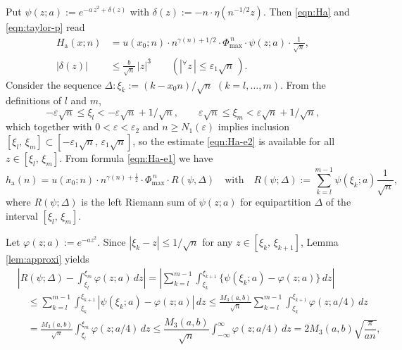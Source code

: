 \documentclass[a4paper,12pt]{article}
\theoremstyle{plain}
\def\ra{\mathrm{a}}
\def\ve{\varepsilon}
\def\vD{\varDelta}
\def\Phim{\Phi_{\scriptstyle \mathrm{max}}}
\def\ds{\displaystyle}
\begin{document}
Put $\psi(z; a) := e^{- a \, z^2 + \delta(z)}$ with 
$\delta(z) := - n \cdot \eta\left(n^{-1/2} z \right)$. 
Then \eqref{eqn:Ha} and \eqref{eqn:taylor-p} read  
\begin{subequations} \label{eqn:Ha-e}
\begin{align}
H_{\ra}(x; n) &= u(x_0; n) \cdot n^{\gamma(n) + 1/2} \cdot  \Phim^{\, n} \cdot 
\psi(z; a) \cdot \frac{1}{\sqrt{n}},   \label{eqn:Ha-e1} \\
|\delta(z)| &\le \frac{b}{\sqrt{n}} \, |z|^3 \qquad 
(|{}^{\forall} z \, | \le \ve_1 \sqrt{n} \,).  \label{eqn:Ha-e2}
\end{align}  
\end{subequations}
Consider the sequence $\vD : \xi_k := (k - x_0 n)/\sqrt{n}$ $(k = l, \dots, m)$.        
From the definitions of $l$ and $m$,    
\begin{equation} \label{eqn:range} 
- \ve \sqrt{n} \le \xi_l < -\ve \sqrt{n} + 1/\sqrt{n}, \qquad 
\ve \sqrt{n} \le \xi_m < \ve \sqrt{n} + 1/\sqrt{n},   
\end{equation}
which together with $0 < \ve < \ve_2$ and $n \ge N_1(\ve)$ implies inclusion 
$[\xi_l, \, \xi_m] \subset [- \ve_1 \sqrt{n}, \, \ve_1 \sqrt{n}]$, so the estimate 
\eqref{eqn:Ha-e2} is available for all $z \in [\xi_l, \, \xi_m]$.  
From formula \eqref{eqn:Ha-e1} we have  
\begin{equation} \label{eqn:R-sum}
h_{\ra}(n) = u(x_0; n) \cdot n^{\gamma(n) + \frac{1}{2} } \cdot \Phim^{\, n} \cdot R(\psi, \vD) 
\quad \mbox{with} \quad 
R(\psi; \vD) := \sum_{k=l}^{m-1} \psi(\xi_k; a) \frac{1}{\sqrt{n}},     
\end{equation}
where $R(\psi; \vD)$ is the left Riemann sum of $\psi(z; a)$ 
for equipartition $\vD$ of the interval $[\xi_l, \, \xi_m]$.  
\par
Let $\varphi(z; a) := e^{-a z^2}$.  
Since $|\xi_k - z| \le 1/\sqrt{n}$ for any $z \in [\xi_k, \, \xi_{k+1}]$, 
Lemma \ref{lem:approxi} yields   
\[
\begin{split}
& \left| R(\psi; \vD) - \int_{\xi_l}^{\xi_m} \varphi(z; a) \, d z \right|
= \left| \sum_{k=l}^{m-1} \int_{\xi_k}^{\xi_{k+1}} 
\{ \psi(\xi_k; a) - \varphi(z; a) \} \, d z \right| \\
& \quad \le \sum_{k=l}^{m-1} \int_{\xi_k}^{\xi_{k+1}} 
\left| \psi(\xi_k; a) - \varphi(z; a) \right| \, d z 
\le \frac{M_3(a, b)}{\sqrt{n}} 
\sum_{k=l}^{m-1} \int_{\xi_k}^{\xi_{k+1}}\varphi(z; a/4) \, d z \\
& \quad =  \frac{M_3(a, b)}{\sqrt{n}} 
\int_{\xi_l}^{\xi_m} \varphi(z; a/4) \, d z 
\le \dfrac{M_3(a, b)}{\sqrt{n}} 
\ds \int_{-\infty}^{\infty} \varphi(z; a/4) \, d z 
= 2 M_3(a, b) \sqrt{\dfrac{\pi}{a n}},  
\end{split}
\]
\end{document}
